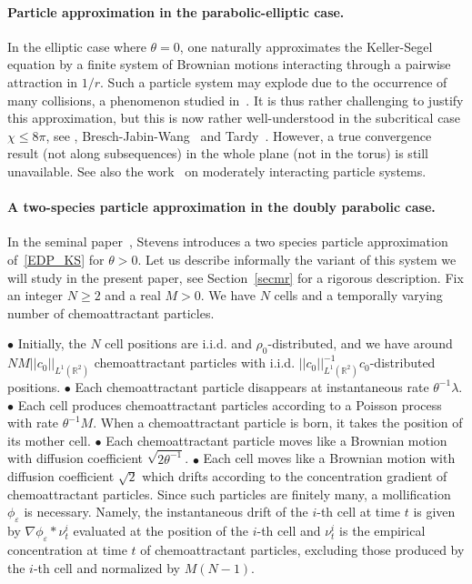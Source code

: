 \documentclass[11pt]{article}
\newcommand{\R}{\mathbb{R}}
\newcommand{\1}{\mathbbm{1}}
\newcommand{\e}{\varepsilon}
\newcommand{\vip}{\vskip5pt}
\begin{document}
\paragraph{Particle approximation in the parabolic-elliptic case.}
In the elliptic case where $\theta=0$, one naturally approximates the Keller-Segel equation by a finite system of Brownian motions interacting through a pairwise attraction in $1/r$. Such a particle system may explode due to the occurrence of many collisions, a phenomenon studied in~\cite{FournierTardy}. It is thus rather challenging to justify this approximation, but this is now rather well-understood in the subcritical case $\chi\leq 8\pi$, see \cite{fournier-jourdain}, Bresch-Jabin-Wang~\cite{BJW}  and Tardy~\cite{T}. However, a true convergence result (not along subsequences) in the whole plane (not in the torus) is still unavailable. See also the work~\cite{ORT} on moderately interacting particle systems. 

\paragraph{A two-species particle approximation in the doubly parabolic case.}
In the seminal paper~\cite{Stevens}, Stevens introduces a two species particle approximation of~\eqref{EDP_KS} for $\theta>0$. Let us describe informally the variant of this system we will study in the present paper, see Section~\ref{secmr} for a rigorous description. Fix an integer $N\geq 2$ and a real $M>0$. We have $N$ cells and a temporally varying number of chemoattractant particles. 

\vip
\noindent $\bullet$ Initially, the $N$ cell positions are i.i.d. and $\rho_0$-distributed, and we have around 
$NM||c_0||_{L^1(\R^2)}$ chemoattractant particles with i.i.d. $||c_0||_{L^1(\R^2)}^{-1}c_0$-distributed positions.
\vip
\noindent $\bullet$ Each chemoattractant particle disappears at instantaneous rate $\theta^{-1}\lambda$.
\vip
\noindent $\bullet$ Each cell produces chemoattractant particles according to a Poisson process with rate $\theta^{-1}M$. When a chemoattractant particle is born, it takes the position of its mother cell.
\vip
\noindent $\bullet$ Each chemoattractant particle moves like a Brownian motion with diffusion coefficient $\sqrt{2 \theta^{-1}}$.
\vip
\noindent $\bullet$ Each cell moves like a Brownian motion with diffusion coefficient $\sqrt 2$ which drifts according to the concentration gradient of chemoattractant particles. Since such particles are finitely many, a mollification $\phi_\e$ is necessary. Namely, the instantaneous drift of the $i$-th cell at time $t$ is given by
$\nabla \phi_\e \ast \nu^{i}_t$ evaluated at the position of the $i$-th cell and $\nu^i_t$ is the empirical concentration at time $t$ of chemoattractant particles, excluding those produced by the $i$-th cell and
normalized by $M(N-1)$.
\end{document}
